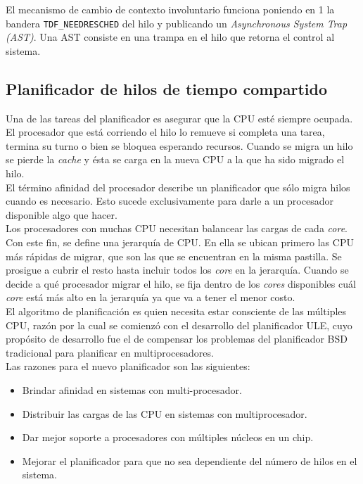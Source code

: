 \documentclass[a4paper]{book}
\begin{document}
El mecanismo de cambio de contexto involuntario funciona poniendo en 1 la bandera \verb|TDF_NEEDRESCHED| del hilo y publicando un \emph{Asynchronous System Trap (AST)}. Una AST consiste en una trampa en el hilo que retorna el control al sistema.

\subsection{Planificador de hilos de tiempo compartido}

Una de las tareas del planificador es asegurar que la CPU esté siempre ocupada. El procesador que est\'a corriendo el hilo lo remueve si completa una tarea, termina su turno o bien se bloquea esperando recursos. Cuando se migra un hilo se pierde la \emph{cache} y \'esta se carga en la nueva CPU a la que ha sido migrado el hilo.\\

El término afinidad del procesador describe un planificador que sólo migra hilos cuando es necesario. Esto sucede exclusivamente para darle a un procesador disponible algo que hacer.\\

Los procesadores con muchas CPU necesitan balancear las cargas de cada \emph{core}. Con este fin, se define una jerarquía de CPU. En ella se ubican primero las CPU más r\'apidas de migrar, que son las que se encuentran en la misma pastilla. Se prosigue a cubrir el resto hasta incluir todos los \emph{core} en la jerarqu\'ia. Cuando se decide a qué procesador migrar el hilo, se fija dentro de los \emph{cores} disponibles cuál \emph{core} est\'a más alto en la jerarquía ya que va a tener el menor costo.\\

El algoritmo de planificación es quien necesita estar consciente de las múltiples CPU, razón por la cual se comienzó con el desarrollo del planificador ULE, cuyo propósito de desarrollo fue el de compensar los problemas del planificador BSD tradicional para planificar en multiprocesadores. \\

Las razones para el nuevo planificador son las siguientes:
\begin{itemize}
\item Brindar afinidad en sistemas con multi-procesador.
\item Distribuir las cargas de las CPU en sistemas con multiprocesador.
\item Dar mejor soporte a procesadores con múltiples núcleos en un chip.
\item Mejorar el planificador para que no sea dependiente del número de hilos en el sistema.
\end{itemize}
\end{document}
